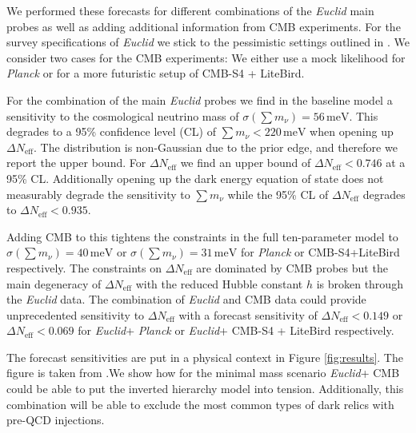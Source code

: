 \documentclass[a4paper,11pt]{article}
\newcommand{\euclid}{\textit{Euclid}\xspace}
\newcommand{\planck}{\textit{Planck}\xspace}
\newcommand{\dneff}{\Delta N_\mathrm{eff}}
\newcommand{\summnu}{\sum m_\nu}
\begin{document}
We performed these forecasts for different combinations of the \euclid main probes as well as adding additional information from CMB experiments. For the survey specifications of \euclid we stick to the pessimistic settings outlined in \cite{Blanchard-EP7}. We consider two cases for the CMB experiments: We either use a mock likelihood for \planck or for a more futuristic setup of CMB-S4 + LiteBird.

For the combination of the main \euclid probes we find in the baseline model a sensitivity to the cosmological neutrino mass of $\sigma\left(\summnu\right) = 56\,\mathrm{meV}$. This degrades to a 95\% confidence level (CL) of $\summnu<220\,\mathrm{meV}$ when opening up $\dneff$. The distribution is non-Gaussian due to the prior edge, and therefore we report the upper bound. For $\dneff$ we find an upper bound of $\dneff<0.746$ at a 95\% CL. Additionally opening up the dark energy equation of state does not measurably degrade the sensitivity to $\summnu$ while the 95\% CL of $\dneff$ degrades to $\dneff<0.935$.  

Adding CMB to this tightens the constraints in the full ten-parameter model to $\sigma\left(\summnu\right) = 40\,\mathrm{meV}$ or $\sigma\left(\summnu\right) = 31\,\mathrm{meV}$ for \planck or CMB-S4+LiteBird respectively. The constraints on $\dneff$ are dominated by CMB probes but the main degeneracy of $\dneff$ with the reduced Hubble constant $h$ is broken through the \euclid data. The combination of \euclid and CMB data could provide unprecedented sensitivity to $\dneff$ with a forecast sensitivity of $\dneff<0.149$ or $\dneff<0.069$ for \euclid + \planck or \euclid + CMB-S4 + LiteBird respectively. 

The forecast sensitivities are put in a physical context in Figure \ref{fig:results}. The figure is taken from \cite{EP-Archidiacono}.We show how for the minimal mass scenario \euclid + CMB could be able to put the inverted hierarchy model into tension. Additionally, this combination will be able to exclude the most common types of dark relics with pre-QCD injections.   
\end{document}
